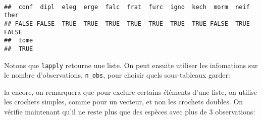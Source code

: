\begin{knitrout}
\color{fgcolor}\begin{kframe}
\begin{flushleft}
\ttfamily\noindent
{}\hlassignement{\usebox{\hlnormalsizeboxlessthan}-}{\ }\hlkeyword{(}\hlkeyword{(}\hlkeyword{,}{\ }\hlkeyword{)}\hlkeyword{)}\hspace*{\fill}\\
\hlstd{}\hlkeyword{\usebox{\hlnormalsizeboxgreaterthan}=}{\ }\mbox{}
\normalfont
\end{flushleft}
\begin{verbatim}
##  conf  dipl  eleg  erge  falc  frat  furc  igno  kech  morm  neif  ther 
## FALSE FALSE  TRUE  TRUE  TRUE  TRUE  TRUE  TRUE  TRUE FALSE  TRUE FALSE 
##  tome 
##  TRUE 
\end{verbatim}
\end{kframe}
\end{knitrout}


\noindent Notons que \texttt{lapply} retourne une liste.
On peut ensuite utiliser les infomations sur le nombre d'observations, \texttt{n\_obs}, pour choisir quels sous-tableaux garder: 

\begin{knitrout}
\color{fgcolor}\begin{kframe}
\begin{flushleft}
\ttfamily\noindent
{}\hlassignement{\usebox{\hlnormalsizeboxlessthan}-}{\ }\hlkeyword{[}\hlkeyword{\usebox{\hlnormalsizeboxgreaterthan}=}{\ }\hlkeyword{]}\mbox{}
\normalfont
\end{flushleft}
\end{kframe}
\end{knitrout}


\noindent la encore, on remarquera que pour exclure certains éléments d'une liste, on utilise les crochets simples, comme pour un vecteur, et non les crochets doubles.
On vérifie maintenant qu'il ne reste plus que des espèces avec plus de 3 observations:

